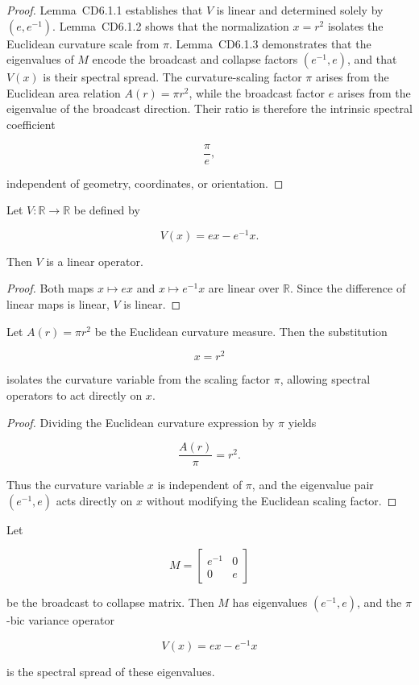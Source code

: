 \documentclass[final,onefignum,onetabnum]{siamart}
\begin{document}
\begin{proof} Lemma~CD6.1.1 establishes that $V$ is linear and determined solely by $(e, e^{-1})$. Lemma~CD6.1.2 shows that the normalization $x = r^{2}$ isolates the Euclidean curvature scale from $\pi$. Lemma~CD6.1.3 demonstrates that the eigenvalues of $M$ encode the broadcast and collapse factors $(e^{-1}, e)$, and that $V(x)$ is their spectral spread. The curvature-scaling factor $\pi$ arises from the Euclidean area relation $A(r)=\pi r^{2}$, while the broadcast factor $e$ arises from the eigenvalue of the broadcast direction. Their ratio is therefore the intrinsic spectral coefficient

\[
\frac{\pi}{e},
\]

independent of geometry, coordinates, or orientation.
\end{proof}

\begin{lemma}
Let $V : \mathbb{R} \to \mathbb{R}$ be defined by

\[
V(x) = e x - e^{-1} x.
\]

Then $V$ is a linear operator.
\end{lemma}

\begin{proof}
Both maps $x \mapsto e x$ and $x \mapsto e^{-1} x$ are linear over $\mathbb{R}$. Since the difference of linear maps is linear, $V$ is linear.
\end{proof}

\begin{lemma}
Let $A(r) = \pi r^{2}$ be the Euclidean curvature measure. Then the substitution

\[
x = r^{2}
\]

isolates the curvature variable from the scaling factor $\pi$, allowing spectral operators to act directly on $x$.
\end{lemma}

\begin{proof}
Dividing the Euclidean curvature expression by $\pi$ yields

\[
\frac{A(r)}{\pi} = r^{2}.
\]

Thus the curvature variable $x$ is independent of $\pi$, and the eigenvalue pair $(e^{-1}, e)$ acts directly on $x$ without modifying the Euclidean scaling factor.
\end{proof}

\begin{lemma}
Let

\[
M =
\begin{bmatrix}
e^{-1} & 0 \\
0 & e
\end{bmatrix}
\]

be the broadcast to collapse matrix. Then $M$ has eigenvalues $(e^{-1}, e)$, and the $\pi$-bic variance operator

\[
V(x) = e x - e^{-1} x
\]

is the spectral spread of these eigenvalues.
\end{lemma}
\end{document}
